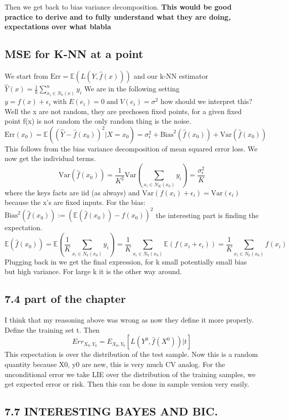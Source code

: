 \documentclass{article}
\begin{document}
Then we get back to bias variance decomposition. 
\textbf{This would be good practice to derive and to fully understand what they are doing, expectations over what blabla}

\subsection*{MSE for K-NN at a point}
We start from $\text{Err} = \mathbb{E}(L(Y,\hat{f}(x)) )$ and our k-NN estimator $\hat{Y}(x) = \frac{1}{k}\sum_{x_i \in N_k(x)}^{n}y_i$
We are in the following setting $y = f(x) + \epsilon_i \; \text{with} \; E(e_i) = 0 \; \text{and} \; V(e_i) = \sigma^2$ how should we 
interpret this? Well the x are not random, they are prechosen fixed points, for a given fixed point f(x) is not random the only random thing is the noise. 
$\text{Err}(x_0) = \mathbb{E}( (\hat{Y} -\hat{f}(x_0))^2 | X = x_0 ) = \sigma_{\epsilon}^2 + \text{Bias}^2(\hat{f}(x_0)) + \text{Var}(\hat{f}(x_0))$
This follows from the bias variance decomposition of mean squared error loss. We now get the individual terms. 
$$ \text{Var}(\hat{f}(x_0)) = \frac{1}{K^2}\text{Var}(\sum_{x_i \in N_K(x_0)}y_i) = \frac{\sigma_{\epsilon}^2}{K}$$
where the keys facts are iid (as always) and $\text{Var}(f(x_i) + \epsilon_i) = \text{Var}(\epsilon_i)$ because the x's are fixed inputs. 
For the bias: $\text{Bias}^2(\hat{f}(x_0)) := (\mathbb{E}(\hat{f}(x_0))-f(x_0))^2 $
the interesting part is finding the expectation.
$$\mathbb{E}(\hat{f}(x_0)) = \mathbb{E} (\frac{1}{K} \sum_{x_i \in N_k(x_0)}y_i) = \frac{1}{K} \sum_{x_i \in N_k(x_0)}\mathbb{E}(f(x_i + \epsilon_i))
= \frac{1}{K}\sum_{x_i \in N_k(x_0)}f(x_i)
$$ 
Plugging back in we get the final expression, for k small potentially small bias but high variance. 
For large k it is the other way around.
\subsection*{7.4 part of the chapter}

I think that my reasoning above was wrong as now they define it more properly.
Define the training set t.
Then $$Err_{X_0,Y_0}= E_{X_0,Y_0}[L(Y^0,\hat{f}(X^0))|t]$$
This expectation is over the distribution of the test sample. Now this is a random quantity because X0, y0 are new, this is very much CV analog.
For the unconditional error we take LIE over the distribution of the training samples, we get expected error or risk. Then this can be done in sample version very easily.
\subsection*{7.7 INTERESTING BAYES AND BIC.}
\end{document}
